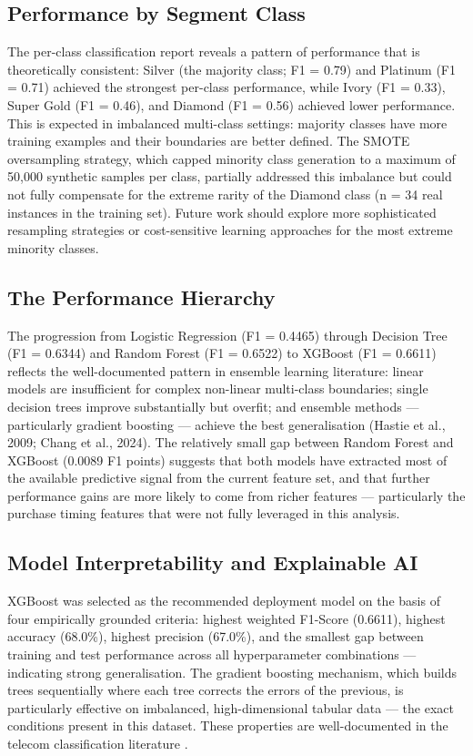 \subsection{Performance by Segment Class}

The per-class classification report reveals a pattern of performance that is theoretically consistent: Silver (the majority class; F1 = 0.79) and Platinum (F1 = 0.71) achieved the strongest per-class performance, while Ivory (F1 = 0.33), Super Gold (F1 = 0.46), and Diamond (F1 = 0.56) achieved lower performance. This is expected in imbalanced multi-class settings: majority classes have more training examples and their boundaries are better defined. The SMOTE oversampling strategy, which capped minority class generation to a maximum of 50,000 synthetic samples per class, partially addressed this imbalance but could not fully compensate for the extreme rarity of the Diamond class (n = 34 real instances in the training set). Future work should explore more sophisticated resampling strategies or cost-sensitive learning approaches for the most extreme minority classes.


\subsection{The Performance Hierarchy}

The progression from Logistic Regression (F1 = 0.4465) through Decision Tree (F1 = 0.6344) and Random Forest (F1 = 0.6522) to XGBoost (F1 = 0.6611) reflects the well-documented pattern in ensemble learning literature: linear models are insufficient for complex non-linear multi-class boundaries; single decision trees improve substantially but overfit; and ensemble methods --- particularly gradient boosting --- achieve the best generalisation (Hastie et al., 2009; Chang et al., 2024). The relatively small gap between Random Forest and XGBoost (0.0089 F1 points) suggests that both models have extracted most of the available predictive signal from the current feature set, and that further performance gains are more likely to come from richer features --- particularly the purchase timing features that were not fully leveraged in this analysis.

\subsection{Model Interpretability and Explainable AI}

XGBoost was selected as the recommended deployment model on the basis of four
empirically grounded criteria: highest weighted F1-Score (0.6611), highest accuracy
(68.0\%), highest precision (67.0\%), and the smallest gap between training and
test performance across all hyperparameter combinations --- indicating strong
generalisation. The gradient boosting mechanism, which builds trees sequentially
where each tree corrects the errors of the previous, is particularly effective on
imbalanced, high-dimensional tabular data --- the exact conditions present in this
dataset. These properties are well-documented in the telecom classification
literature \cite{ref11, ref8}.

